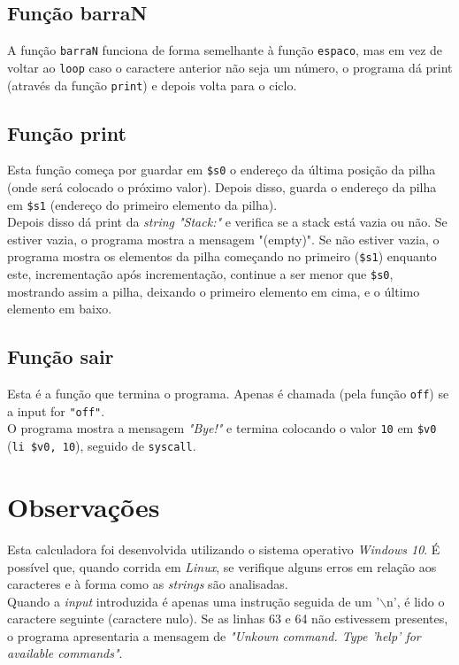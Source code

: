 \documentclass[12pt, a4paper]{article}
\begin{document}
        \newpage
        
        \subsection{Função barraN}
        A função \texttt{barraN} funciona de forma semelhante à função \texttt{espaco}, mas em vez de voltar ao \texttt{loop} caso o caractere anterior não seja um número, o programa dá print (através da função \texttt{print}) e depois volta para o ciclo.
        
        \subsection{Função print}
        Esta função começa por guardar em \texttt{\$s0} o endereço da última posição da pilha (onde será colocado o próximo valor). Depois disso, guarda o endereço da pilha em \texttt{\$s1} (endereço do primeiro elemento da pilha).\\
        Depois disso dá print da \textit{string "Stack:"} e verifica se a stack está vazia ou não. Se estiver vazia, o programa mostra a mensagem "(empty)". Se não estiver vazia, o programa mostra os elementos da pilha começando no primeiro (\texttt{\$s1}) enquanto este, incrementação após incrementação, continue a ser menor que \texttt{\$s0}, mostrando assim a pilha, deixando o primeiro elemento em cima, e o último elemento em baixo.
        
        \subsection{Função sair}
        Esta é a função que termina o programa. Apenas é chamada (pela função \texttt{off}) se a input for \texttt{"off"}.\\
        O programa mostra a mensagem \textit{"Bye!"} e termina colocando o valor \texttt{10} em \texttt{\$v0} (\texttt{li \$v0, 10}), seguido de \texttt{syscall}.
        
        \section{Observações}
        Esta calculadora foi desenvolvida utilizando o sistema operativo \textit{Windows 10}. É possível que, quando corrida em \textit{Linux}, se verifique alguns erros em relação aos caracteres e à forma como as \textit{strings} são analisadas.\\
        Quando a \textit{input} introduzida é apenas uma instrução seguida de um '$\backslash$n', é lido o caractere seguinte (caractere nulo). Se as linhas 63 e 64 não estivessem presentes, o programa apresentaria a mensagem de \textit{"Unkown command. Type 'help' for available commands"}.
        
\end{document}
